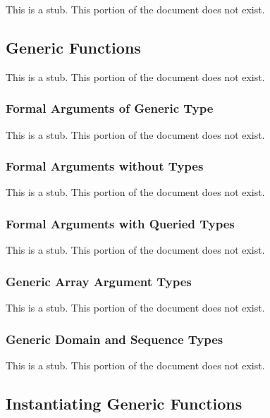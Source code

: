 \label{Generics}

This is a stub.  This portion of the document does not exist.

\subsection{Generic Functions}
\label{Generic_Functions}

This is a stub.  This portion of the document does not exist.

\subsubsection{Formal Arguments of Generic Type}
\label{Formal_Arguments_of_Generic_Type}

This is a stub.  This portion of the document does not exist.

\subsubsection{Formal Arguments without Types}
\label{Formal_Arguments_without_Types}

This is a stub.  This portion of the document does not exist.

\subsubsection{Formal Arguments with Queried Types}
\label{Formal_Arguments_with_Queried_Types}

This is a stub.  This portion of the document does not exist.

\subsubsection{Generic Array Argument Types}
\label{Generic_Array_Argument_Types}

This is a stub.  This portion of the document does not exist.

\subsubsection{Generic Domain and Sequence Types}
\label{Generic_Domain_and_Sequence_Types}

This is a stub.  This portion of the document does not exist.

\subsection{Instantiating Generic Functions}
\label{Instantiating_Generic_Functions}

